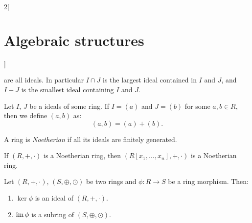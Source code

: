\documentclass[../../../main.tex]{subfiles}
\begin{document}
\begin{multicols}{2}[\section{Algebraic structures}]
\begin{prop}
    are all ideals. In particular $I\cap J$ is the largest ideal contained in $I$ and $J$, and $I+J$ is the smallest ideal containing $I$ and $J$.
\end{prop}
\begin{definition}
    Let $I$, $J$ be a ideals of some ring. If $I=(a)$ and $J=(b)$ for some $a,b\in R$, then we define $(a,b)$ as: $$(a,b)=(a)+(b).$$
\end{definition}
\begin{definition}
    A ring is \textit{Noetherian} if all its ideals are finitely generated.
\end{definition}
\begin{theorem}
    If $(R,+,\cdot)$ is a Noetherian ring, then $(R[x_1,\ldots,x_n],+,\cdot)$ is a Noetherian ring.
\end{theorem}
\begin{lemma}
    Let $(R,+,\cdot)$, $(S,\oplus,\odot)$ be two rings and $\phi:R\rightarrow S$ be a ring morphism. Then:
    \begin{enumerate}
        \item $\ker\phi$ is an ideal of $(R,+,\cdot)$.
        \item $\operatorname{im}\phi$ is a subring of $(S,\oplus,\odot)$.
    \end{enumerate}
\end{lemma}

\end{multicols}
\end{document}
